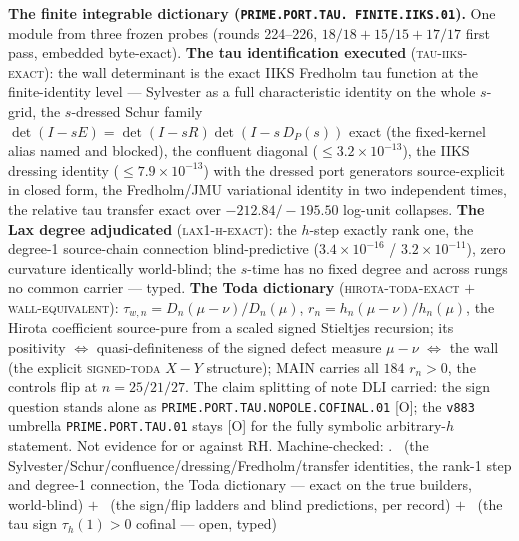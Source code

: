 \par\smallskip\noindent\textbf{The finite integrable dictionary
(\texttt{PRIME.\allowbreak PORT.\allowbreak TAU.\allowbreak
FINITE.\allowbreak IIKS.01}).}
One module from three frozen probes (rounds 224--226, $18/18 +
15/15 + 17/17$ first pass, embedded byte-exact).  \textbf{The tau
identification executed} (\textsc{tau-iiks-exact}): the wall
determinant is the exact IIKS Fredholm tau function at the
finite-identity level --- Sylvester as a full characteristic
identity on the whole $s$-grid, the $s$-dressed Schur family
$\det(I - sE) = \det(I - sR)\det(I - s\,D_P(s))$ exact (the
fixed-kernel alias named and blocked), the confluent diagonal
($\le 3.2\times10^{-13}$), the IIKS dressing identity
($\le 7.9\times10^{-13}$) with the dressed port generators
source-explicit in closed form, the Fredholm/JMU variational
identity in two independent times, the relative tau transfer
exact over $-212.84/-195.50$ log-unit collapses.  \textbf{The Lax
degree adjudicated} (\textsc{lax1-h-exact}): the $h$-step exactly
rank one, the degree-1 source-chain connection blind-predictive
($3.4\times10^{-16}$ / $3.2\times10^{-11}$), zero curvature
identically world-blind; the $s$-time has no fixed degree and
across rungs no common carrier --- typed.  \textbf{The Toda
dictionary} (\textsc{hirota-toda-exact} $+$
\textsc{wall-equivalent}): $\tau_{w,n} = D_n(\mu - \nu)/D_n(\mu)$,
$r_n = h_n(\mu - \nu)/h_n(\mu)$, the Hirota coefficient
source-pure from a scaled signed Stieltjes recursion; its
positivity $\iff$ quasi-definiteness of the signed defect
measure $\mu - \nu$ $\iff$ the wall (the explicit
\textsc{signed-toda} $X - Y$ structure); MAIN carries all $184$
$r_n > 0$, the controls flip at $n = 25/21/27$.  The claim
splitting of note DLI carried: the sign question stands alone as
\texttt{PRIME.PORT.TAU.NOPOLE.COFINAL.01} [O]; the
\texttt{v883} umbrella \texttt{PRIME.PORT.TAU.01} stays [O] for
the fully symbolic arbitrary-$h$ statement.  Not evidence for or
against RH.
Machine-checked: .
\mE\ (the Sylvester/Schur/confluence/dressing/Fredholm/transfer
identities, the rank-1 step and degree-1 connection, the Toda
dictionary --- exact on the true builders, world-blind) $+$ \mC\
(the sign/flip ladders and blind predictions, per record) $+$
\mO\ (the tau sign $\tau_h(1) > 0$ cofinal --- open, typed)
\par\smallskip


